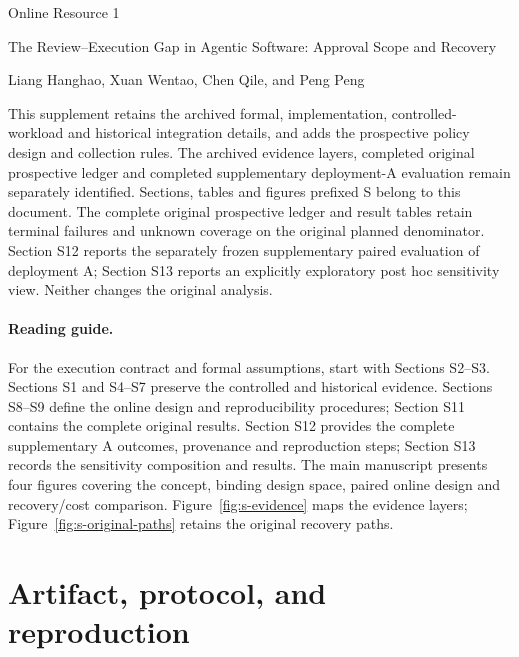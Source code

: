 \documentclass[11pt,a4paper]{article}
\begin{document}
\begin{center}
{\Large Online Resource 1}\par\medskip
{\large The Review--Execution Gap in Agentic Software: Approval Scope and Recovery}\par\medskip
Liang Hanghao, Xuan Wentao, Chen Qile, and Peng Peng
\par{}
\end{center}

This supplement retains the archived formal, implementation, controlled-workload and historical integration details, and adds the prospective policy design and collection rules. The archived evidence layers, completed original prospective ledger and completed supplementary deployment-A evaluation remain separately identified. Sections, tables and figures prefixed S belong to this document. The complete original prospective ledger and result tables retain terminal failures and unknown coverage on the original planned denominator. Section S12 reports the separately frozen supplementary paired evaluation of deployment A; Section S13 reports an explicitly exploratory post hoc sensitivity view. Neither changes the original analysis.

\paragraph{Reading guide.} For the execution contract and formal assumptions, start with Sections S2--S3. Sections S1 and S4--S7 preserve the controlled and historical evidence. Sections S8--S9 define the online design and reproducibility procedures; Section S11 contains the complete original results. Section S12 provides the complete supplementary A outcomes, provenance and reproduction steps; Section S13 records the sensitivity composition and results. The main manuscript presents four figures covering the concept, binding design space, paired online design and recovery/cost comparison. Figure~\ref{fig:s-evidence} maps the evidence layers; Figure~\ref{fig:s-original-paths} retains the original recovery paths.

\section{Artifact, protocol, and reproduction}
\label{app:artifact}
\end{document}
